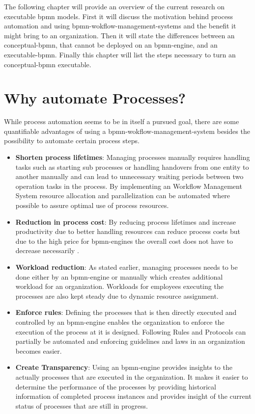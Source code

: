 
The following chapter will provide an overview of the current research on executable \gls{bpmn} models. First it will discuss the motivation behind process automation and using \gls{bpmn-wokflow-management-system}s and the benefit it might bring to an organization. Then it will state the differences between an \gls{conceptual-bpmn}, that cannot be deployed on an \gls{bpmn-engine}, and an \gls{executable-bpmn}. Finally this chapter will list the steps necessary to turn an \gls{conceptual-bpmn} executable.

\section{Why automate Processes?}
While process automation seems to be in itself a pursued goal, there are some quantifiable advantages of using a \gls{bpmn-wokflow-management-system} besides the possibility to automate certain process steps.
\begin{itemize}
	\item \textbf{Shorten process lifetimes}: Managing processes manually requires handling tasks such as starting sub processes or handling handovers from one entity to another manually and can lead to unnecessary waiting periods between two operation tasks in the process. By implementing an Workflow Management System resource allocation and parallelization can be automated where possible to assure optimal use of process resources. \cite{gadatsch2020grundkurs}
	\item \textbf{Reduction in process cost}: By reducing process lifetimes and increase productivity due to better handling resources can reduce process costs \cite{gadatsch2020grundkurs} but due to the high price for \gls{bpmn-engine}s the overall cost does not have to decrease necessarily \cite{gruber2009profitability}.
	\item \textbf{Workload reduction}: As stated earlier, managing processes needs to be done either by an \gls{bpmn-engine} or manually which creates additional workload for an organization. Workloads for employees executing the processes are also kept steady due to dynamic resource assignment. \cite{fundamentals}\cite{gadatsch2020grundkurs}
	\item \textbf{Enforce rules}: Defining the processes that is then directly executed and controlled by an \gls{bpmn-engine} enables the organization to enforce the execution of the process at it is designed. Following Rules and Protocols can partially be automated and enforcing guidelines and laws in an organization becomes easier. \cite{fundamentals}
	\item \textbf{Create Transparency}: Using an \gls{bpmn-engine} provides insights to the actually processes that are executed in the organization. It makes it easier to determine the performance of the processes by providing historical information of completed process instances and provides insight of the current status of processes that are still in progress. \cite{gadatsch2020grundkurs}
\end{itemize}

